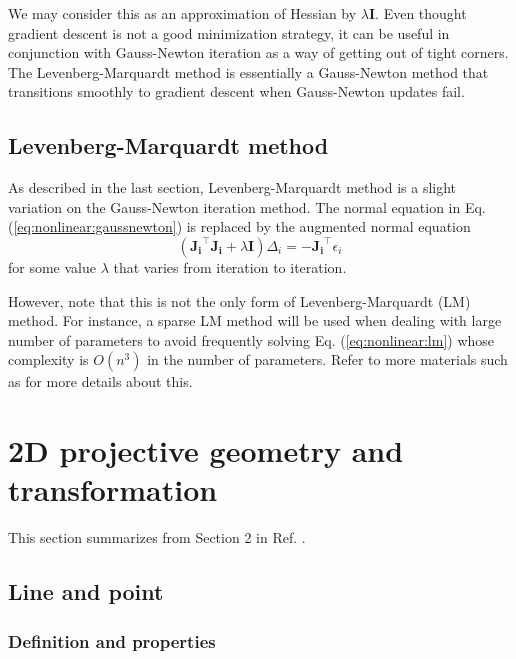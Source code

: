 \documentclass[12pt]{article}
\numberwithin{equation}{section}
\begin{document}
We may consider this as an approximation of Hessian by $\lambda \mathbf{I}$. Even thought gradient descent is not a good minimization strategy, it can be useful in conjunction with Gauss-Newton iteration as a way of getting out of tight corners. The Levenberg-Marquardt method is essentially a Gauss-Newton method that transitions smoothly to gradient descent when Gauss-Newton updates fail.

\subsection{Levenberg-Marquardt method}

As described in the last section, Levenberg-Marquardt method is a slight variation on the Gauss-Newton iteration method. The normal equation in Eq. (\ref{eq:nonlinear:gaussnewton}) is replaced by the augmented normal equation
\begin{equation}
(\mathbf{J_i}^\top\mathbf{J_i} + \lambda\mathbf{I})\Delta_i = -\mathbf{J_i}^\top \epsilon_i
\label{eq:nonlinear:lm}
\end{equation}
for some value $\lambda$ that varies from iteration to iteration.

However, note that this is not the only form of Levenberg-Marquardt (LM) method. For instance, a sparse LM method will be used when dealing with large number of parameters to avoid frequently solving Eq. (\ref{eq:nonlinear:lm}) whose complexity is $O(n^3)$ in the number of parameters. Refer to more materials such as \citep{hartley2003multiple} for more details about this.

\newpage

\section{2D projective geometry and transformation}
\label{sec:2d}

This section summarizes from Section 2 in Ref. \cite{hartley2003multiple}.

\subsection{Line and point}

\subsubsection{Definition and properties}
\end{document}
